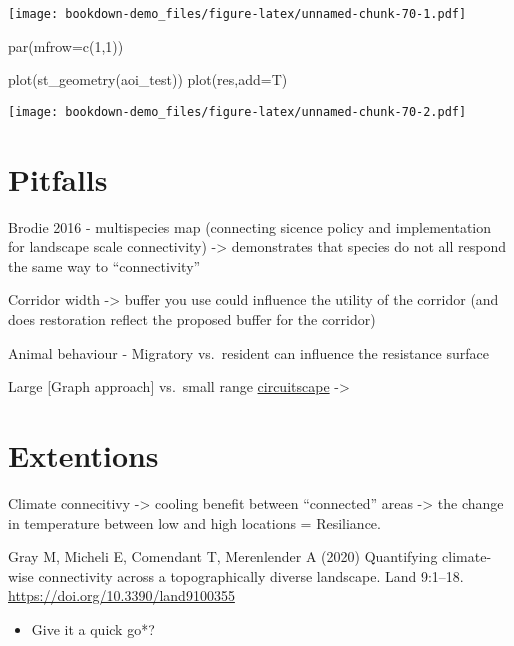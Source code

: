 \documentclass[
]{book}
\newenvironment{Shaded}{\begin{snugshade}}{\end{snugshade}}
\newcommand{\AttributeTok}[1]{\textcolor[rgb]{0.77,0.63,0.00}{#1}}
\newcommand{\DecValTok}[1]{\textcolor[rgb]{0.00,0.00,0.81}{#1}}
\newcommand{\FunctionTok}[1]{\textcolor[rgb]{0.00,0.00,0.00}{#1}}
\newcommand{\NormalTok}[1]{#1}
\providecommand{\tightlist}{%
  \setlength{\itemsep}{0pt}\setlength{\parskip}{0pt}}
\begin{document}
\texttt{[image: bookdown-demo\_files/figure-latex/unnamed-chunk-70-1.pdf]}

\begin{Shaded}
\begin{Highlighting}[]
\FunctionTok{par}\NormalTok{(}\AttributeTok{mfrow=}\FunctionTok{c}\NormalTok{(}\DecValTok{1}\NormalTok{,}\DecValTok{1}\NormalTok{))}

\FunctionTok{plot}\NormalTok{(}\FunctionTok{st\_geometry}\NormalTok{(aoi\_test))}
\FunctionTok{plot}\NormalTok{(res,}\AttributeTok{add=}\NormalTok{T)}
\end{Highlighting}
\end{Shaded}

\texttt{[image: bookdown-demo\_files/figure-latex/unnamed-chunk-70-2.pdf]}

\hypertarget{pitfalls}{%
\section{Pitfalls}\label{pitfalls}}

Brodie 2016 - multispecies map (connecting sicence policy and implementation for landscape scale connectivity) -\textgreater{} demonstrates that species do not all respond the same way to ``connectivity''

Corridor width -\textgreater{} buffer you use could influence the utility of the corridor (and does restoration reflect the proposed buffer for the corridor)

Animal behaviour - Migratory vs.~resident can influence the resistance surface

Large {[}Graph approach{]} vs.~small range \protect\hyperlink{circuitscape}{circuitscape} -\textgreater{}

\hypertarget{extentions}{%
\section{Extentions}\label{extentions}}

Climate connecitivy -\textgreater{} cooling benefit between ``connected'' areas -\textgreater{} the change in temperature between low and high locations = Resiliance.

Gray M, Micheli E, Comendant T, Merenlender A (2020) Quantifying climate-wise connectivity across a topographically diverse landscape. Land 9:1--18. \url{https://doi.org/10.3390/land9100355}

\begin{itemize}
\tightlist
\item
  Give it a quick go*?
\end{itemize}

  
\end{document}
